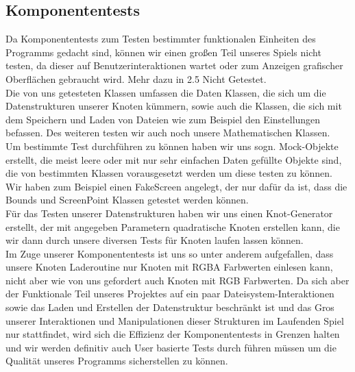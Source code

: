 %



\newpage



\label{Abschnitt:Tests:Protokoll:Komponenten}



\subsection*{Komponententests}


Da Komponententests zum Testen bestimmter funktionalen Einheiten des Programms gedacht sind, können wir einen großen Teil unseres Spiels nicht testen, da dieser auf Benutzerinteraktionen wartet oder zum Anzeigen grafischer Oberflächen gebraucht wird. 
Mehr dazu in 2.5 Nicht Getestet.\\

Die von uns getesteten Klassen umfassen die Daten Klassen, die sich um die Datenstrukturen unserer Knoten kümmern, sowie auch die Klassen, die sich mit dem Speichern und Laden von Dateien wie zum Beispiel den Einstellungen befassen.
Des weiteren testen wir auch noch unsere Mathematischen Klassen.\\

Um bestimmte Test durchführen zu können haben wir uns sogn. Mock-Objekte erstellt, die meist leere oder mit nur sehr einfachen Daten gefüllte Objekte sind, die von bestimmten Klassen vorausgesetzt werden um diese testen zu können. Wir haben zum Beispiel einen FakeScreen angelegt, der nur dafür da ist, dass die Bounds und ScreenPoint Klassen getestet werden können.\\

Für das Testen unserer Datenstrukturen haben wir uns einen Knot-Generator erstellt, der mit angegeben Parametern quadratische Knoten erstellen kann, die wir dann durch unsere diversen Tests für Knoten laufen lassen können.\\

Im Zuge unserer Komponententests ist uns so unter anderem aufgefallen, dass unsere Knoten Laderoutine nur Knoten mit RGBA Farbwerten einlesen kann, nicht aber wie von uns gefordert auch Knoten mit RGB Farbwerten. Da sich aber der Funktionale Teil unseres Projektes auf ein paar Dateisystem-Interaktionen sowie das Laden und Erstellen der Datenstruktur beschränkt ist und das Gros unserer Interaktionen und Manipulationen dieser Strukturen im Laufenden Spiel nur stattfindet, wird sich die Effizienz der Komponententests in Grenzen halten und wir werden definitiv auch User basierte Tests durch führen müssen um die Qualität unseres Programms sicherstellen zu können.

